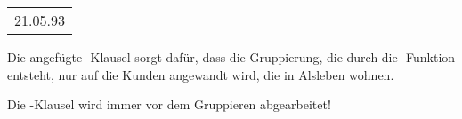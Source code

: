         \begin{center}
          \begin{small}
            \tablehead{}
            \begin{msoraclesql}
              \begin{supertabular}{l}
                21.05.93 \\
              \end{supertabular}
            \end{msoraclesql}
          \end{small}
        \end{center}
        Die angef\"ugte \WHERE-Klausel sorgt daf\"ur, dass die Gruppierung, die durch die -Funktion entsteht, nur auf die Kunden angewandt wird, die in Alsleben wohnen.
        \begin{merke}
          Die \WHERE-Klausel wird immer vor dem Gruppieren abgearbeitet!
        \end{merke}
